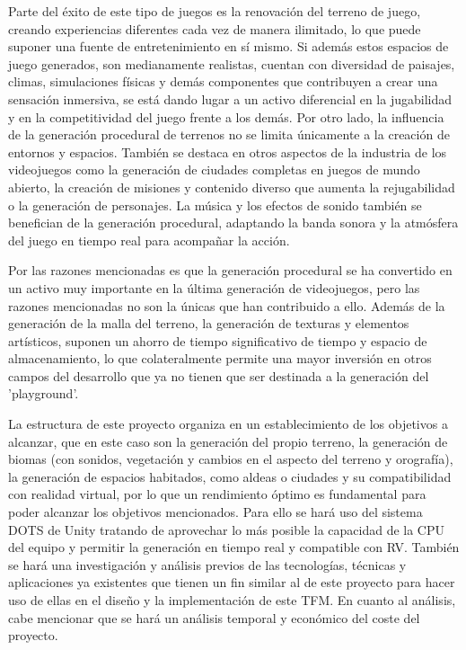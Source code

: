 Parte del éxito de este tipo de juegos es la renovación del terreno de juego, creando experiencias diferentes cada vez de manera ilimitado, lo que puede suponer una fuente de entretenimiento en sí mismo. Si además estos espacios de juego generados, son medianamente realistas, cuentan con diversidad de paisajes, climas, simulaciones físicas y demás componentes que contribuyen a crear una sensación inmersiva, se está dando lugar a un activo diferencial en la jugabilidad y en la competitividad del juego frente a los demás. Por otro lado, la influencia de la generación procedural de terrenos no se limita únicamente a la creación de entornos y espacios. También se destaca en otros aspectos de la industria de los videojuegos como la generación de ciudades completas en juegos de mundo abierto, la creación de misiones y contenido diverso que aumenta la rejugabilidad o la generación de personajes. La música y los efectos de sonido también se benefician de la generación procedural, adaptando la banda sonora y la atmósfera del juego en tiempo real para acompañar la acción.

Por las razones mencionadas es que la generación procedural se ha convertido en un activo muy importante en la última generación de videojuegos, pero las razones mencionadas no son la únicas que han contribuido a ello. Además de la generación de la malla del terreno, la generación de texturas y elementos artísticos, suponen un ahorro de tiempo significativo de tiempo y espacio de almacenamiento, lo que colateralmente permite una mayor inversión en otros campos del desarrollo que ya no tienen que ser destinada a la generación del 'playground'. 

La estructura de este proyecto organiza en un establecimiento de los objetivos a alcanzar, que en este caso son la generación del propio terreno, la generación de biomas (con sonidos, vegetación y cambios en el aspecto del terreno y orografía), la generación de espacios habitados, como aldeas o ciudades y su compatibilidad con realidad virtual, por lo que un rendimiento óptimo es fundamental para poder alcanzar los objetivos mencionados. Para ello se hará uso del sistema DOTS de Unity tratando de aprovechar lo más posible la capacidad de la CPU del equipo y permitir la generación en tiempo real y compatible con RV. También se hará una investigación y análisis previos de las tecnologías, técnicas y aplicaciones ya existentes que tienen un fin similar al de este proyecto para hacer uso de ellas en el diseño y la implementación de este TFM. En cuanto al análisis, cabe mencionar que se hará un análisis temporal y económico del coste del proyecto. 

